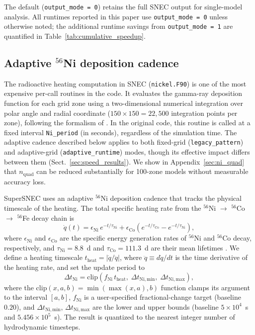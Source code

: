\documentclass[twocolumn,linenumbers]{aastex701}
\begin{document}
The default (\texttt{output\_mode\,=\,0}) retains the full SNEC output for single-model analysis. All runtimes reported in this paper use \texttt{output\_mode\,=\,0} unless otherwise noted; the additional runtime savings from \texttt{output\_mode\,=\,1} are quantified in Table~\ref{tab:cumulative_speedup}.

\subsection{Adaptive $^{56}$Ni deposition cadence}
\label{sec:ni_cadence}

The radioactive heating computation in SNEC (\texttt{nickel.F90}) is one of the most expensive per-call routines in the code. It evaluates the gamma-ray deposition function for each grid zone using a two-dimensional numerical integration over polar angle and radial coordinate ($150 \times 150 = 22{,}500$ integration points per zone), following the formalism of \citet{Swartz1995}. In the original code, this routine is called at a fixed interval \texttt{Ni\_period} (in seconds), regardless of the simulation time. The adaptive cadence described below applies to both fixed-grid (\texttt{legacy\_pattern}) and adaptive-grid (\texttt{adaptive\_runtime}) modes, though its effective impact differs between them (Sect.~\ref{sec:speed_results}). We show in Appendix~\ref{sec:ni_quad} that $n_\mathrm{quad}$ can be reduced substantially for 100-zone models without measurable accuracy loss.

SuperSNEC uses an adaptive $^{56}$Ni deposition cadence that tracks the physical timescale of the heating. The total specific heating rate from the $^{56}$Ni $\rightarrow$ $^{56}$Co $\rightarrow$ $^{56}$Fe decay chain is \citep{Arnett1982}
\begin{equation}
\dot{q}(t) = \epsilon_{\mathrm{Ni}}\, e^{-t/\tau_{\mathrm{Ni}}} + \epsilon_{\mathrm{Co}}\left(e^{-t/\tau_{\mathrm{Co}}} - e^{-t/\tau_{\mathrm{Ni}}}\right),
\end{equation}
where $\epsilon_{\mathrm{Ni}}$ and $\epsilon_{\mathrm{Co}}$ are the specific energy generation rates of $^{56}$Ni and $^{56}$Co decay, respectively, and $\tau_{\mathrm{Ni}} = 8.8$~d and $\tau_{\mathrm{Co}} = 111.3$~d are their mean lifetimes \citep{Nadyozhin1994}. We define a heating timescale $t_{\mathrm{heat}} = |\dot{q} / \ddot{q}|$, where $\ddot{q} \equiv d\dot{q}/dt$ is the time derivative of the heating rate, and set the update period to
\begin{equation}
\Delta t_{\mathrm{Ni}} = \mathrm{clip}\!\left(f_{\mathrm{Ni}}\, t_{\mathrm{heat}},\; \Delta t_{\mathrm{Ni,min}},\; \Delta t_{\mathrm{Ni,max}}\right),
\label{eq:ni_cadence}
\end{equation}
where the $\mathrm{clip}(x, a, b) = \min(\max(x, a), b)$ function clamps its argument to the interval $[a, b]$, $f_{\mathrm{Ni}}$ is a user-specified fractional-change target (baseline $0.20$), and $\Delta t_{\mathrm{Ni,min}}$, $\Delta t_{\mathrm{Ni,max}}$ are the lower and upper bounds (baseline $5 \times 10^4$~s and $5.456 \times 10^5$~s). The result is quantized to the nearest integer number of hydrodynamic timesteps.
\end{document}
